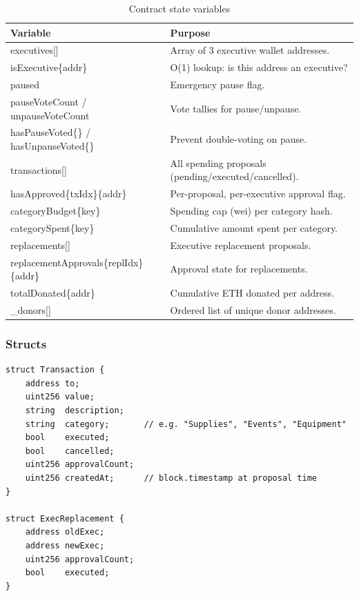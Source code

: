 \documentclass[12pt,a4paper]{article}
\begin{document}
\begin{table}[h]
  \centering
  \begin{tabularx}{\linewidth}{>{\ttfamily}lX}
    \toprule
    Variable & Purpose \\
    \midrule
    executives[] & Array of 3 executive wallet addresses. \\
    isExecutive\{addr\} & O(1) lookup: is this address an executive? \\
    paused & Emergency pause flag. \\
    pauseVoteCount / unpauseVoteCount & Vote tallies for pause/unpause. \\
    hasPauseVoted\{\} / hasUnpauseVoted\{\} & Prevent double-voting on pause. \\
    transactions[] & All spending proposals (pending/executed/cancelled). \\
    hasApproved\{txIdx\}\{addr\} & Per-proposal, per-executive approval flag. \\
    categoryBudget\{key\} & Spending cap (wei) per category hash. \\
    categorySpent\{key\} & Cumulative amount spent per category. \\
    replacements[] & Executive replacement proposals. \\
    replacementApprovals\{replIdx\}\{addr\} & Approval state for replacements. \\
    totalDonated\{addr\} & Cumulative ETH donated per address. \\
    \_donors[] & Ordered list of unique donor addresses. \\
    \bottomrule
  \end{tabularx}
  \caption{Contract state variables}
\end{table}

\subsubsection*{Structs}

\begin{lstlisting}[caption={Transaction and ExecReplacement structs}]
struct Transaction {
    address to;
    uint256 value;
    string  description;
    string  category;       // e.g. "Supplies", "Events", "Equipment"
    bool    executed;
    bool    cancelled;
    uint256 approvalCount;
    uint256 createdAt;      // block.timestamp at proposal time
}

struct ExecReplacement {
    address oldExec;
    address newExec;
    uint256 approvalCount;
    bool    executed;
}
\end{lstlisting}
\end{document}

